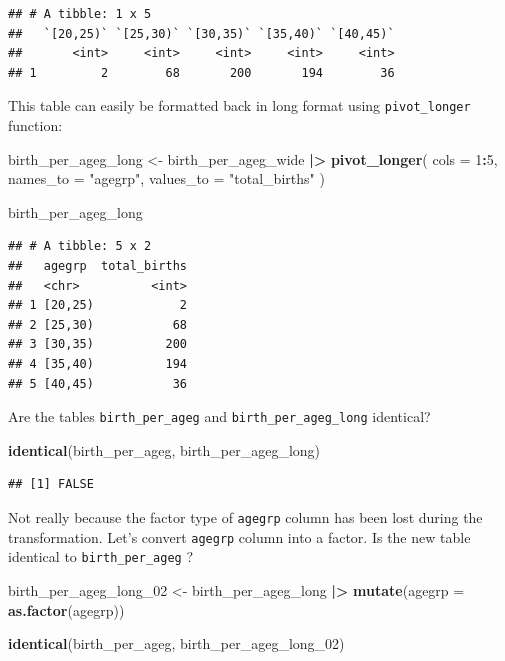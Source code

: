 \documentclass[
]{book}
\newenvironment{Shaded}{\begin{snugshade}}{\end{snugshade}}
\newcommand{\AttributeTok}[1]{\textcolor[rgb]{0.13,0.29,0.53}{#1}}
\newcommand{\DecValTok}[1]{\textcolor[rgb]{0.00,0.00,0.81}{#1}}
\newcommand{\FunctionTok}[1]{\textcolor[rgb]{0.13,0.29,0.53}{\textbf{#1}}}
\newcommand{\NormalTok}[1]{#1}
\newcommand{\OtherTok}[1]{\textcolor[rgb]{0.56,0.35,0.01}{#1}}
\newcommand{\SpecialCharTok}[1]{\textcolor[rgb]{0.81,0.36,0.00}{\textbf{#1}}}
\newcommand{\StringTok}[1]{\textcolor[rgb]{0.31,0.60,0.02}{#1}}
\begin{document}
\begin{verbatim}
## # A tibble: 1 x 5
##   `[20,25)` `[25,30)` `[30,35)` `[35,40)` `[40,45)`
##       <int>     <int>     <int>     <int>     <int>
## 1         2        68       200       194        36
\end{verbatim}

This table can easily be formatted back in long format using \texttt{pivot\_longer} function:

\begin{Shaded}
\begin{Highlighting}[]
\NormalTok{birth\_per\_ageg\_long }\OtherTok{\textless{}{-}}
\NormalTok{  birth\_per\_ageg\_wide }\SpecialCharTok{|\textgreater{}}
  \FunctionTok{pivot\_longer}\NormalTok{(}
    \AttributeTok{cols =} \DecValTok{1}\SpecialCharTok{:}\DecValTok{5}\NormalTok{, }
    \AttributeTok{names\_to =} \StringTok{"agegrp"}\NormalTok{, }
    \AttributeTok{values\_to =} \StringTok{"total\_births"}
\NormalTok{  )}

\NormalTok{birth\_per\_ageg\_long}
\end{Highlighting}
\end{Shaded}

\begin{verbatim}
## # A tibble: 5 x 2
##   agegrp  total_births
##   <chr>          <int>
## 1 [20,25)            2
## 2 [25,30)           68
## 3 [30,35)          200
## 4 [35,40)          194
## 5 [40,45)           36
\end{verbatim}

Are the tables \texttt{birth\_per\_ageg} and \texttt{birth\_per\_ageg\_long} identical?

\begin{Shaded}
\begin{Highlighting}[]
\FunctionTok{identical}\NormalTok{(birth\_per\_ageg, birth\_per\_ageg\_long)}
\end{Highlighting}
\end{Shaded}

\begin{verbatim}
## [1] FALSE
\end{verbatim}

Not really because the factor type of \texttt{agegrp} column has been lost during the transformation.
Let's convert \texttt{agegrp} column into a factor. Is the new table identical to \texttt{birth\_per\_ageg} ?

\begin{Shaded}
\begin{Highlighting}[]
\NormalTok{birth\_per\_ageg\_long\_02 }\OtherTok{\textless{}{-}}
\NormalTok{  birth\_per\_ageg\_long }\SpecialCharTok{|\textgreater{}}
  \FunctionTok{mutate}\NormalTok{(}\AttributeTok{agegrp =} \FunctionTok{as.factor}\NormalTok{(agegrp))}

\FunctionTok{identical}\NormalTok{(birth\_per\_ageg, birth\_per\_ageg\_long\_02)}
\end{Highlighting}
\end{Shaded}
\end{document}
